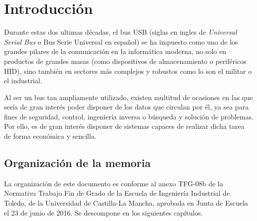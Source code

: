 \chapter{Introducción} 
\label{ch:introduccion}

Durante estas dos ultimas décadas, el bus USB\cite{specification2000revision} (siglas en ingles de \emph{Universal Serial Bus} o Bus Serie Universal en español) se ha impuesto como uno de los grandes pilares de la comunicación en la informática moderna, no solo en productos de grandes masas (como dispositivos de almacenamiento o periféricos HID\cite{usb:hid}), sino también en sectores más complejos y robustos como lo son el militar o el industrial.

Al ser un bus tan ampliamente utilizado, existen multitud de ocasiones en las que sería de gran interés poder disponer de los datos que circulan por él, ya sea para fines de seguridad\cite{NISSIM2017675}, control, ingeniería inversa o búsqueda y solución de problemas. Por ello, es de gran interés disponer de sistemas capaces de realizar dicha tarea de forma económica y sencilla.




\section{Organización de la memoria} 
La organización de este documento es conforme al anexo TFG-08b\cite{tfg08b} de la Normativa Trabajo Fin de Grado de la Escuela de Ingeniería Industrial de Toledo, de la Universidad de Castilla-La Mancha, aprobada en Junta de Escuela el 23 de junio de 2016. Se descompone en los siguientes capítulos.

